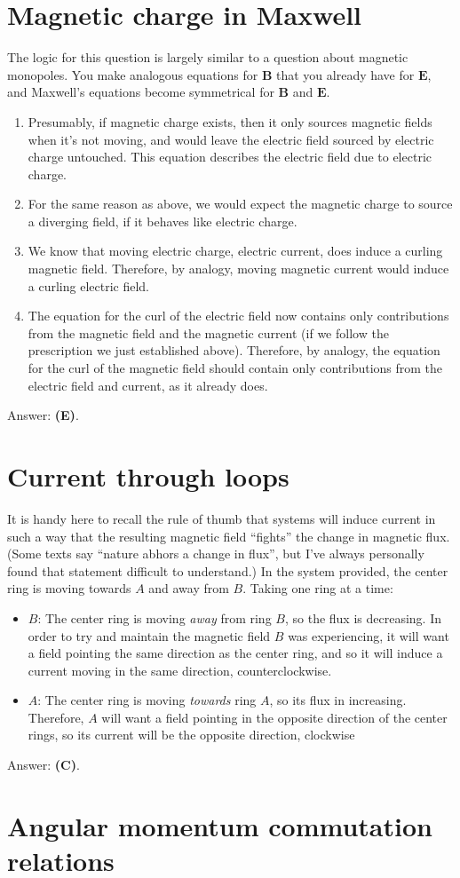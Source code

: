 \documentclass[11pt]{paper}
\newcommand{\answer}[1]{Answer: \textbf{(#1)}.}
\begin{document}
\section{Magnetic charge in Maxwell}
The logic for this question is largely similar to a question about magnetic monopoles.  You make analogous equations for $\mathbf{B}$ that you already have for $\mathbf{E}$, and Maxwell's equations become symmetrical for $\mathbf{B}$ and $\mathbf{E}$.
\begin{enumerate}[label=\Roman*.]
\item Presumably, if magnetic charge exists, then it only sources magnetic fields when it's not moving, and would leave the electric field sourced by electric charge untouched.  This equation describes the electric field due to electric charge.
\item For the same reason as above, we would expect the magnetic charge to source a diverging field, if it behaves like electric charge.
\item We know that moving electric charge, electric current, does induce a curling magnetic field.  Therefore, by analogy, moving magnetic current would induce a curling electric field.
\item The equation for the curl of the electric field now contains only contributions from the magnetic field and the magnetic current (if we follow the prescription we just established above).  Therefore, by analogy, the equation for the curl of the magnetic field should contain only contributions from the electric field and current, as it already does.
\end{enumerate}
\answer{E}

\section{Current through loops}
It is handy here to recall the rule of thumb that systems will induce current in such a way that the resulting magnetic field ``fights'' the change in magnetic flux.  (Some texts say ``nature abhors a change in flux'', but I've always personally found that statement difficult to understand.)  In the system provided, the center ring is moving towards $A$ and away from $B$.  Taking one ring at a time:
\begin{itemize}
\item{$B$}: The center ring is moving \emph{away} from ring $B$, so the flux is decreasing.  In order to try and maintain the magnetic field $B$ was experiencing, it will want a field pointing the same direction as the center ring, and so it will induce a current moving in the same direction, counterclockwise.
\item{$A$}:  The center ring is moving \emph{towards} ring $A$, so its flux in increasing.  Therefore, $A$ will want a field pointing in the opposite direction of the center rings, so its current will be the opposite direction, clockwise
\end{itemize}

\answer{C}

\section{Angular momentum commutation relations}
\end{document}
